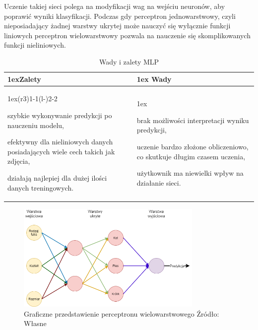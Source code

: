Uczenie takiej sieci polega na modyfikacji wag na wejściu neuronów, aby poprawić
wyniki klasyfikacji. Podczas gdy perceptron jednowarstwowy, czyli nieposiadający żadnej warstwy ukrytej może 
nauczyć się wyłącznie funkcji liniowych perceptron wielowarstwowy pozwala na nauczenie
się skomplikowanych funkcji nieliniowych.

\begin{table}[h]
    \begin{tabularx}{\linewidth}{>{\parskip1ex}X@{\kern4\tabcolsep}>{\parskip1ex}X}
    \toprule
    \hfil\bfseries Zalety
    &
    \hfil\bfseries Wady
    \\\cmidrule(r{3\tabcolsep}){1-1}\cmidrule(l{-\tabcolsep}){2-2}
    
    szybkie wykonywanie predykcji po nauczeniu modelu,\par
    efektywny dla nieliniowych danych posiadających wiele cech takich jak zdjęcia,\par
    działają najlepiej dla dużej ilości danych treningowych.\par
    &
    
    brak możliwości interpretacji wyniku predykcji,\par
    uczenie bardzo złożone obliczeniowo, co skutkuje długim czasem uczenia,\par
    użytkownik ma niewielki wpływ na działanie sieci.\par
    \\\bottomrule
    \end{tabularx}
    \caption{Wady i zalety MLP}
\end{table}

\begin{figure}[h]
    \centering
    \includegraphics[width=0.8\textwidth]{./Img/MLP.png}
    \caption{Graficzne przedstawienie perceptronu wielowarstwowego Źródło: Własne}
\end{figure}


